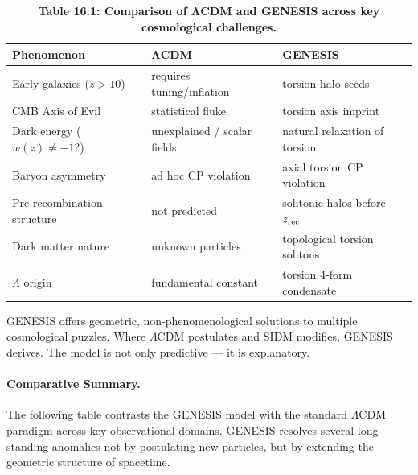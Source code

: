 \documentclass{article}
\begin{document}
\begin{table}[h!]
\centering
\renewcommand{\arraystretch}{1.4}
\caption*{\textbf{Table 16.1: Comparison of ΛCDM and GENESIS across key cosmological challenges.}}
\begin{tabular}{|p{4.5cm}|p{4.5cm}|p{5cm}|}
\hline
\textbf{Phenomenon} & \textbf{ΛCDM} & \textbf{GENESIS} \\
\hline
Early galaxies ($z > 10$) & requires tuning/inflation & torsion halo seeds \\
\hline
CMB Axis of Evil & statistical fluke & torsion axis imprint \\
\hline
Dark energy ($w(z) \ne -1$?) & unexplained / scalar fields & natural relaxation of torsion \\
\hline
Baryon asymmetry & ad hoc CP violation & axial torsion CP violation \\
\hline
Pre-recombination structure & not predicted & solitonic halos before $z_{\rm rec}$ \\
\hline
Dark matter nature & unknown particles & topological torsion solitons \\
\hline
$\Lambda$ origin & fundamental constant & torsion 4-form condensate \\
\hline
\end{tabular}
\label{tab:model_comparison_text}
\end{table}



\begin{tcolorbox}[colback=gray!5, colframe=black!30, title=Why this matters]
GENESIS offers geometric, non-phenomenological solutions to multiple cosmological puzzles. Where $\Lambda$CDM postulates and SIDM modifies, GENESIS derives. The model is not only predictive — it is explanatory.
\end{tcolorbox}



\paragraph{Comparative Summary.}
The following table contrasts the GENESIS model with the standard $\Lambda$CDM paradigm across key observational domains. 
GENESIS resolves several long-standing anomalies not by postulating new particles, but by extending the geometric structure of spacetime.
\end{document}
